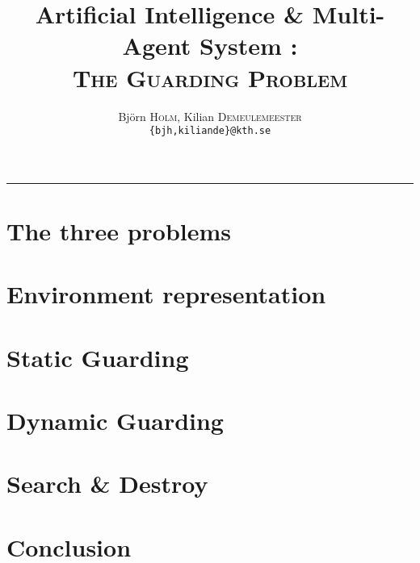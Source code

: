 \documentclass[a4paper,8pt,twocolumn]{extarticle}
\title{Artificial Intelligence \& Multi-Agent System :\\ \textsc{The Guarding Problem}}
\author{Björn \textsc{Holm}, Kilian \textsc{Demeulemeester} \\ \texttt{\{bjh,kiliande\}@kth.se}}
\begin{document}

 \maketitle

\tableofcontents

\vspace{0.5cm}
\hrule
\vspace{0.5cm}



\section{The three problems}


\section{Environment representation}


\section{Static Guarding}



\section{Dynamic Guarding}



\section{Search \& Destroy}


\section*{Conclusion}


\nocite{*}


\end{document}
